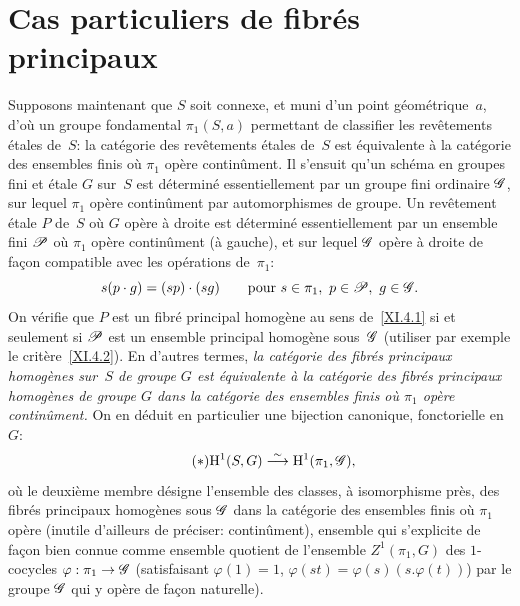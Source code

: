 \section{Cas particuliers de fibr\'es principaux}
\label{XI.5}

Supposons maintenant que $S$ soit connexe, et muni d'un point
g\'eom\'etrique~$a$, d'o\`u un groupe fondamental $\pi_1(S,a)$
permettant de classifier les rev\^etements \'etales de~$S$: la
cat\'egorie des rev\^etements \'etales de~$S$ est
\'equivalente \`a la cat\'egorie des ensembles finis o\`u
$\pi_1$ op\`ere contin\^ument. Il s'ensuit qu'un sch\'ema en
groupes fini et \'etale $G$ sur~$S$ est d\'etermin\'e
essentiellement par un groupe fini ordinaire $\cal{G}$, sur lequel
$\pi_1$ op\`ere contin\^ument par automorphismes de groupe. Un
rev\^etement \'etale $P$ de~$S$ o\`u $G$ op\`ere \`a droite
est d\'etermin\'e essentiellement par un ensemble fini $\cal{P}$
o\`u $\pi_1$ op\`ere contin\^ument (\`a gauche), et sur lequel
$\cal{G}$ op\`ere \`a droite de fa\c con compatible avec les
op\'erations de~$\pi_1$:
$$
s(p\cdot g)=(sp)\cdot(sg)\qquad \text{pour }s\in\pi_1,\
p\in\cal{P},\ g\in\cal{G}.
$$
On v\'erifie que $P$ est un fibr\'e principal homog\`ene au sens
de~\ref{XI.4.1} si et seulement si $\cal{P}$ est un ensemble principal
homog\`ene sous~$\cal{G}$ (utiliser par exemple le
crit\`ere~\ref{XI.4.2}). En d'autres termes, \emph{la catégorie
des fibrés principaux homogènes sur~$S$ de groupe $G$ est
équivalente à la catégorie des fibrés principaux
homogènes de groupe $G$ dans la catégorie des ensembles finis
où $\pi_1$ opère continûment.} On en d\'eduit en
particulier une bijection canonique, fonctorielle en $G$:
\begin{equation*}
\label{eq:XI.5.etoile}
\tag{$*$} \H^1(S,G)\isomto \H^1(\pi_1,\cal{G})\quoi,
\end{equation*}
o\`u
le deuxi\`eme membre d\'esigne l'ensemble des classes, \`a
isomorphisme pr\`es, des fibr\'es principaux homog\`enes sous
$\cal{G}$ dans la cat\'egorie des ensembles finis o\`u $\pi_1$
op\`ere (inutile d'ailleurs de pr\'eciser: contin\^ument),
ensemble qui s'explicite de fa\c con bien connue comme ensemble
quotient de l'ensemble $Z^1(\pi_1,G)$ des $1$-cocycles
$\varphi:\pi_1\to \cal{G}$ (satisfaisant $\varphi(1)=1$,
$\varphi(st)=\varphi(s)(s.\varphi(t))$) par le groupe $\cal{G}$ qui y
op\`ere de fa\c con naturelle).

